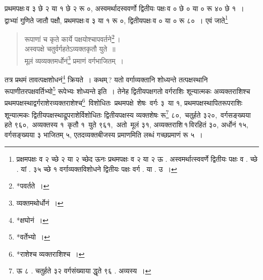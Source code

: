 \documentclass[10pt, openany]{book}
\begin{document}
{{{{{{ प्रथमपक्षः\textendash \,व ३ छे २ या १ छे २ रू ०, अस्वमर्थादस्ववर्णो द्वितीयः पक्षः\textendash \,व ० छे ० या ० रू ४० छे १~। द्वाभ्यां गुणिते जातौ पक्षौ, प्रथमपक्षः\textendash \,व ३ या १ रू ०, द्वितीयपक्षः\textendash \,व ० या ० रू ८०~। एवं जाते\renewcommand{\thefootnote}{१८}\footnote{प्रक्षमपक्षः व २ च्छे 
२ या २ च्छेद ऊनः प्रथमपक्षः व २ या २ ऊ . अस्वमर्थात्स्ववर्णे द्वितीयः
पक्षः व . च्छे . यां . ३५ च्छे १ वर्गाव्यक्तविशोधने द्वितीयः पक्षः वर्ग . या . उ~।} 

\newpage

\begin{quote}
    {\qt रूपाणां च कृते कार्ये पक्षयोश्चापवर्तने\renewcommand{\thefootnote}{१}\footnote{*पवर्तते~।}\,।\\
अस्वपक्षे चतुर्वर्गहतेऽव्यक्तकृतौ युते~॥\\
मूलं व्यव्यक्तमर्धोनं\renewcommand{\thefootnote}{२}\footnote{व्यक्तमथोर्धोनं~।} प्रमाणं वर्गभाजितम्~।}
\end{quote}

 {तत्र प्रथमं तावत्पक्षशोधनं\renewcommand{\thefootnote}{३}\footnote{*क्षघोनं~।} क्रियते~। कथम्\,? यतो वर्गाव्यक्तानि
शोध्यन्ते तत्पक्षस्थानि}
{रूपाणीतरपक्षवर्तिभ्यो\renewcommand{\thefootnote}{४}\footnote{*वर्तेभ्यो~।} रूपेभ्यः शोध्यन्ते इति~। तेनेह
द्वितीयपक्षगतो वर्गराशिः शून्यात्मकः}
{अव्यक्तराशिश्च \,प्रथमपक्षस्थाद्वर्गराशेरव्यक्तराशेश्च\renewcommand{\thefootnote}{५}\footnote{*राशेश्च व्यक्तराशिश्च~।} \,विशोधितः \,प्रथमपक्षे \,शेषः \,वर्गः ३ \,या १,}
{प्रथमपक्षस्थापितरूपराशिः शून्यात्मकः द्वितीयपक्षस्थाद्रूपराशेर्विशोधितः
द्वितीयपक्षस्य व्यक्तशेषः}
{रू\renewcommand{\thefootnote}{६}\footnote{ऊ ८ . चतुर्हते ३२ वर्गसंख्याया द्धृते ९६ . अव्यस्य~।} ८०, \,चतुर्हते ३२०, \,वर्गसङ्ख्यया \,हते ९६०, \,अव्यक्तस्य १ \,कृतौ १ \,युते ९६१, \,अतो \,मूलं}
{३१, अव्यक्तराशि\textendash \,१\textendash \,विरहितं ३०, अर्धोनं १५, वर्गसङ्ख्यया ३ भाजितम् ५,
एतदव्यक्तबीजस्य प्रमाणमिति लब्धं गच्छप्रमाणं रू ५~।}
\vspace{3mm}

}}}}}}
\end{document}
